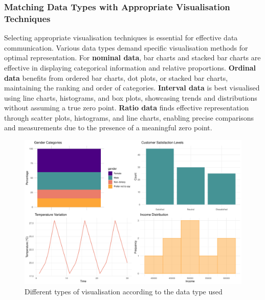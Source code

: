 \documentclass{article}\usepackage[]{graphicx}\usepackage[]{xcolor}
\makeatletter
\def\maxwidth{ %
  \ifdim\Gin@nat@width>\linewidth
    \linewidth
  \else
    \Gin@nat@width
  \fi
}
\newenvironment{knitrout}{}{} %
\makeatother
\begin{document}
\subsubsection{Matching Data Types with Appropriate Visualisation Techniques}
Selecting appropriate visualisation techniques is essential for effective data communication. Various data types demand specific visualisation methods for optimal representation. For \textbf{nominal data}, bar charts and stacked bar charts are effective in displaying categorical information and relative proportions. \textbf{Ordinal data} benefits from ordered bar charts, dot plots, or stacked bar charts, maintaining the ranking and order of categories. \textbf{Interval data} is best visualised using line charts, histograms, and box plots, showcasing trends and distributions without assuming a true zero point. \textbf{Ratio data} finds effective representation through scatter plots, histograms, and line charts, enabling precise comparisons and measurements due to the presence of a meaningful zero point.
\\ 
\begin{knitrout}\scriptsize
{}\color{fgcolor}\begin{figure}[H]

{\centering \includegraphics[width=\maxwidth]{figure/beamer-data-plots-1} 

}

\caption[Different types of visualisation according to the data type used]{Different types of visualisation according to the data type used}\label{fig:data-plots}
\end{figure}

\end{knitrout}
\end{document}
